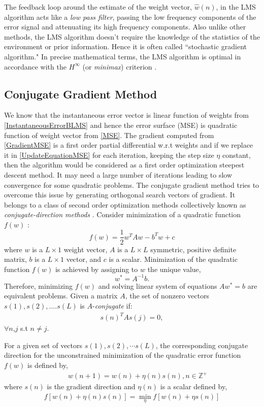 \documentclass{UCF_ETD}
\begin{document}
The feedback loop around the estimate of the weight vector, $\hat{w}(n)$, in the LMS algorithm acts like a \emph{low pass filter}, passing the low frequency components of the error signal and attenuating its high frequency components. Also unlike other methods, the LMS algorithm doesn't require the knowledge of the statistics of the environment or prior information. Hence it is often called ``stochastic gradient algorithm." In precise mathematical terms, the LMS algorithm is optimal in accordance with the $ H^\infty $ (or \emph{minimax}) criterion \cite{Hassibi1996}.

\subsection{Conjugate Gradient Method}
We know that the instantaneous error vector is linear function of weights from \eqref{InstantaneousErrorBLMS} and hence the error surface (MSE) is quadratic function of weight vector from \eqref{MSE}. The gradient computed from \eqref{GradientMSE} is a first order partial differential w.r.t weights and if we replace it in \eqref{UpdateEquationMSE} for each iteration, keeping the step size $\eta$ constant, then the algorithm would be considered as a first order optimization steepest descent method. It may need a large number of iterations leading to slow convergence for some quadratic problems. The conjugate gradient method tries to overcome this issue by generating orthogonal search vectors of gradient. It belongs to a class of second order optimization methods collectively known as \emph{conjugate-direction methods} \cite{Powell1977}. Consider minimization of a quadratic function $f(w)$ :
\[f(w)=\frac{1}{2}w^TAw-b^Tw+c\]
\indent where $w$ is a $ L \times 1$ weight vector, $A$ is a $L\times L$ symmetric, positive definite matrix, $b$ is a $L \times 1$ vector, and $c$ is a scalar. Minimization of the quadratic function $f(w)$ is achieved by assigning to $w$ the unique value,
$$w^*=A^{-1}b.$$
Therefore, minimizing $f(w)$ and solving linear system of equations $Aw^*=b$ are equivalent problems. Given a matrix $A$, the set of nonzero vectors $s(1),s(2),….s(L)$ is $A$-\emph{conjugate} if:
\begin{eqnarray*}
{s(n)}^TAs(j)=0,
\end{eqnarray*}
 $\forall n$,$j$ s.t $n \not= j$.

For a given set of vectors $s(1),s(2),\cdots s(L)$, the corresponding conjugate direction for the unconstrained minimization of the quadratic error function $f(w)$  is defined by,
\begin{eqnarray}
&&w(n+1)=w(n)+ \eta(n)s(n), n \in \mathbb{Z^+}
\end{eqnarray}
\indent where $s(n)$ is the gradient direction and $\eta(n)$ is a scalar defined by,
\begin{eqnarray*}
f [w(n)+ \eta (n)s(n)]= \min_\eta f[w(n)+ \eta s(n)]
\end{eqnarray*}
\end{document}
